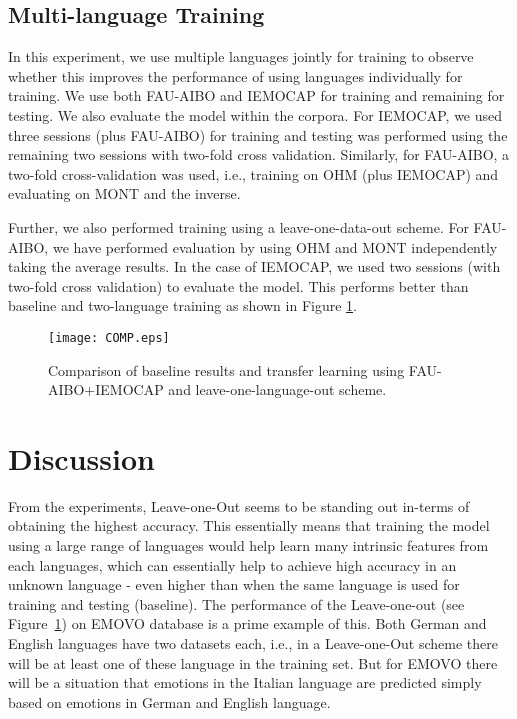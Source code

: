 \documentclass[a4paper]{article}
\newcommand*{\RR}[1]{\textcolor{purple}{#1}}
\begin{document}
\subsection{Multi-language Training}

In this experiment, we use multiple languages jointly for training to observe whether this improves the performance of using languages individually for training. We use both FAU-AIBO and IEMOCAP for training and remaining for testing. We also evaluate the model within the corpora. For IEMOCAP, we used three sessions (plus FAU-AIBO) for training  and testing was performed using the remaining two sessions with two-fold cross validation. Similarly, for FAU-AIBO, a two-fold cross-validation was used, i.e., training on OHM (plus IEMOCAP) and evaluating on MONT and the inverse.


Further, we also performed training using a leave-one-data-out scheme. For FAU-AIBO, we have performed evaluation by using OHM and MONT independently taking the average results. In the case of IEMOCAP, we used two sessions (with two-fold cross validation) to evaluate the model. This performs better than baseline and two-language training as shown in Figure \ref{fig:G2}. %

\begin{figure}[!ht]
\centering
\captionsetup{justification=centering}
\centerline{\texttt{[image: COMP.eps]}}
\caption{Comparison of baseline results and transfer learning using FAU-AIBO+IEMOCAP and leave-one-language-out scheme.}
\label{fig:G2}
\end{figure}







\section{Discussion}
\label{Sec: Insigts}
From the experiments, Leave-one-Out seems to be standing out in-terms of obtaining the highest accuracy. This essentially means that training the model using a large range of languages would help learn many intrinsic features from each languages, which can essentially help to achieve high accuracy in an unknown language - even higher than when the same language is used for training and testing (baseline). The performance of the Leave-one-out (see Figure~\ref{fig:G2}) on EMOVO database is a prime example of this. Both German and English languages have two datasets each, i.e., in a Leave-one-Out scheme there will be at least one of these language in the training set. But for EMOVO there will be a situation that emotions in the Italian language are predicted simply based on emotions in German and English language. 
\end{document}
